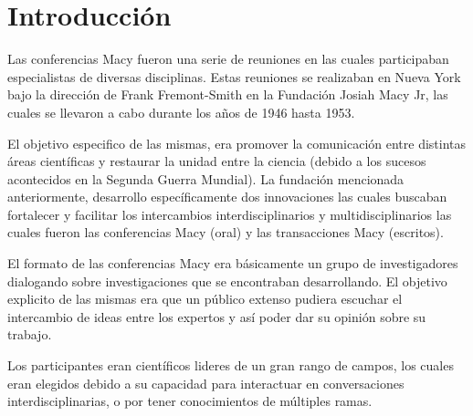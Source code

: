 \section{Introducción}
	Las conferencias Macy fueron una serie de reuniones en las cuales participaban especialistas de diversas disciplinas. 
	Estas reuniones se realizaban en Nueva York bajo la dirección de Frank Fremont-Smith en la Fundación Josiah Macy Jr, las cuales se llevaron a cabo durante los años de 1946 hasta 1953.

	El objetivo especifico de las mismas, era promover la comunicación entre distintas áreas científicas y restaurar la unidad entre la ciencia (debido a los sucesos acontecidos en la Segunda Guerra Mundial). La fundación mencionada anteriormente, desarrollo específicamente dos innovaciones las cuales buscaban fortalecer y facilitar los intercambios interdisciplinarios y multidisciplinarios las cuales fueron las conferencias Macy (oral) y las transacciones Macy (escritos).

	El formato de las conferencias Macy era básicamente un grupo de investigadores dialogando sobre investigaciones que se encontraban desarrollando. El objetivo explicito de las mismas era que un público extenso pudiera escuchar el intercambio de ideas entre los expertos y así poder dar su opinión sobre su trabajo.

	Los participantes eran científicos lideres de un gran rango de campos, los cuales eran elegidos debido a su capacidad para interactuar en conversaciones interdisciplinarias, o por tener conocimientos de múltiples ramas.
